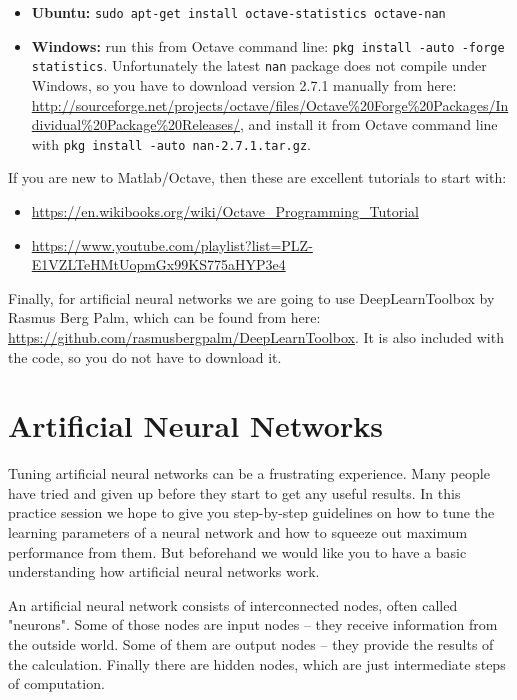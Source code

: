 \documentclass[a4paper,11pt]{article}
\begin{document}
\begin{itemize}
	\item \textbf{Ubuntu:} \texttt{sudo apt-get install octave-statistics octave-nan}
	\item \textbf{Windows:} run this from Octave command line: \texttt{pkg install -auto -forge statistics}. Unfortunately the latest \texttt{nan} package does not compile under Windows, so you have to download version 2.7.1 manually from here: \url{http://sourceforge.net/projects/octave/files/Octave%20Forge%20Packages/Individual%20Package%20Releases/}, and install it from Octave command line with \texttt{pkg install -auto nan-2.7.1.tar.gz}.
\end{itemize}

If you are new to Matlab/Octave, then these are excellent tutorials to start with:
\begin{itemize}
	\item \url{https://en.wikibooks.org/wiki/Octave_Programming_Tutorial}
	\item \url{https://www.youtube.com/playlist?list=PLZ-E1VZLTeHMtUopmGx99KS775aHYP3e4}
\end{itemize}

Finally, for artificial neural networks we are going to use DeepLearnToolbox by Rasmus Berg Palm, which can be found from here: \url{https://github.com/rasmusbergpalm/DeepLearnToolbox}. It is also included with the code, so you do not have to download it.

%
%
\section{Artificial Neural Networks}

Tuning artificial neural networks can be a frustrating experience. Many people have tried and given up before they start to get any useful results. In this practice session we hope to give you step-by-step guidelines on how to tune the learning parameters of a neural network and how to squeeze out maximum performance from them. But beforehand we would like you to have a basic understanding how artificial neural networks work.

An artificial neural network consists of interconnected nodes, often called "neurons". Some of those nodes are input nodes -- they receive information from the outside world. Some of them are output nodes -- they provide the results of the calculation. Finally there are hidden nodes, which are just intermediate steps of computation.
\end{document}
